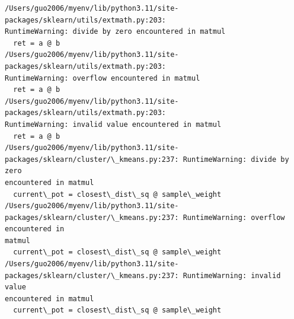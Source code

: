 \documentclass[11pt]{article}
\begin{document}
    \begin{Verbatim}[commandchars=\\\{\}]
/Users/guo2006/myenv/lib/python3.11/site-packages/sklearn/utils/extmath.py:203:
RuntimeWarning: divide by zero encountered in matmul
  ret = a @ b
/Users/guo2006/myenv/lib/python3.11/site-packages/sklearn/utils/extmath.py:203:
RuntimeWarning: overflow encountered in matmul
  ret = a @ b
/Users/guo2006/myenv/lib/python3.11/site-packages/sklearn/utils/extmath.py:203:
RuntimeWarning: invalid value encountered in matmul
  ret = a @ b
/Users/guo2006/myenv/lib/python3.11/site-
packages/sklearn/cluster/\_kmeans.py:237: RuntimeWarning: divide by zero
encountered in matmul
  current\_pot = closest\_dist\_sq @ sample\_weight
/Users/guo2006/myenv/lib/python3.11/site-
packages/sklearn/cluster/\_kmeans.py:237: RuntimeWarning: overflow encountered in
matmul
  current\_pot = closest\_dist\_sq @ sample\_weight
/Users/guo2006/myenv/lib/python3.11/site-
packages/sklearn/cluster/\_kmeans.py:237: RuntimeWarning: invalid value
encountered in matmul
  current\_pot = closest\_dist\_sq @ sample\_weight
    \end{Verbatim}

    \begin{center}
    \end{center}
    

    
    
    
\end{document}
